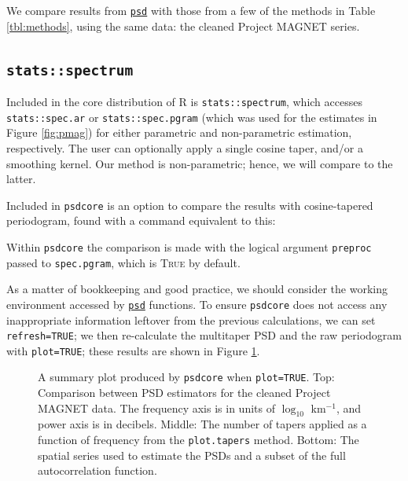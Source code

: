 \documentclass[10pt]{article}\usepackage[]{graphicx}\usepackage[]{color}
\newcommand{\SC}[1]{\textsc{#1}}
\newcommand{\Rcmd}[1]{\texttt{#1}}
\newcommand{\psd}[0]{\href{http://www.github.com/abarbour/psd/}{\color{blue}\Rcmd{psd}}}
\begin{document}


We compare results from
\psd{} with those from a few of the methods in Table \ref{tbl:methods},
using the same data: the cleaned Project MAGNET series.

\subsection{\Rcmd{stats::spectrum}}

Included in the core distribution of R is \Rcmd{stats::spectrum}, which
accesses \Rcmd{stats::spec.ar} or \Rcmd{stats::spec.pgram} (which was used
for the estimates in Figure \ref{fig:pmag}) for either
parametric and non-parametric estimation, respectively.  
The user can optionally apply a single cosine taper, and/or a smoothing kernel.
Our method is non-parametric; hence, we will compare to the latter.

Included in \Rcmd{psdcore} is an option to compare the 
results with cosine-tapered periodogram,
found with a command equivalent to this:

Within \Rcmd{psdcore} the comparison is made with the logical argument \Rcmd{preproc} 
passed to \Rcmd{spec.pgram}, which is \SC{True} by default.

As a matter of bookkeeping and good practice, we should consider the working environment
accessed by \psd{} functions. 
To ensure \Rcmd{psdcore} does not access any inappropriate information leftover
from the previous calculations, we can set \Rcmd{refresh=TRUE}; we then 
re-calculate the multitaper PSD and the raw periodogram with \Rcmd{plot=TRUE}; these
results are shown in Figure \ref{fig:two}.

\begin{figure}[!htbp]
\begin{center}

\caption{A summary plot produced by \Rcmd{psdcore} when
\Rcmd{plot=TRUE}.  
Top: Comparison between PSD estimators for the 
cleaned Project MAGNET data. The frequency axis is in units of $\log_{10}$ km$^{-1}$,
and power axis is in decibels.
%
Middle: The number of tapers applied as a function of frequency from
the \Rcmd{plot.tapers} method. 
%
Bottom: The spatial series used to estimate the PSDs and a subset
of the full autocorrelation function.}
\label{fig:two}
\end{center}
\end{figure}

\clearpage
\end{document}
